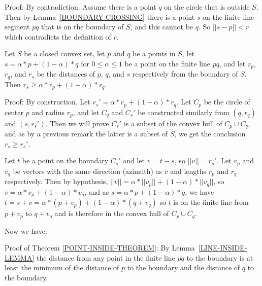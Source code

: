 \documentclass[12pt]{article}
\begin{document}
\begin{indpar}{0.2in}
Proof:  By contradiction.  Assume there is a point $q$ on the circle
that is outside $S$.  Then by Lemma~\ref{BOUNDARY-CROSSING} there is
a point $s$ on the finite line segment $pq$ that is on the boundary of
$S$, and this cannot be $q$.  So $||s-p||<r$ which contradicts the
definition of $r$.
\end{indpar}

\begin{lemma}\label{LINE-INSIDE-LEMMA}
Let $S$ be a closed convex set, let $p$ and $q$ be a points in $S$,
let $s=\alpha*p+(1-\alpha)*q$ for $0\le\alpha\le 1$ be a point on the
finite line $pq$, and let $r_p$, $r_q$, and $r_s$ be the distances
of $p$, $q$, and $s$ respectively from the boundary of $S$.
Then $r_s\ge\alpha*r_p+(1-\alpha)*r_q$.
\end{lemma}

\begin{indpar}{0.2in}
Proof:  By construction.  Let $r_s'=\alpha*r_p+(1-\alpha)*r_q$.
Let $C_p$ be the circle of center $p$ and
radius $r_p$, and let $C_q$ and $C_s'$ be constructed similarly from
$(q,r_q)$ and $(s,r_s')$.  Then we will prove $C_s'$ is a subset of
the convex hull of $C_p\cup C_q$, and as by a previous remark
the latter is a subset of $S$, we get the conclusion $r_s\ge r_s'$.

Let $t$ be a point on the boundary $C_s'$ and let $v=t-s$, so
$||v||=r_s'$.  Let $v_p$ and $v_q$ be vectors
with the same direction (azimuth) as $v$ and lengths $r_p$ and $r_q$
respectively.  Then by hypothesis,
$||v|| = \alpha*||v_p||+(1-\alpha)*||v_q||$, so
$v = \alpha*v_p+(1-\alpha)*v_q$, and as
$s = \alpha*p+(1-\alpha)*q$, we have
$t=s+v=\alpha*(p+v_p)+(1-\alpha)*(q+v_q)$ so
$t$ is on the finite line from $p+v_p$ to $q+v_q$ and is therefore in the
convex hull of $C_p\cup C_q$.
\end{indpar}

Now we have:

\begin{indpar}{0.2in}
Proof of Theorem \ref{POINT-INSIDE-THEOREM}:
By Lemma~\ref{LINE-INSIDE-LEMMA} the distance from any point in
the finite line $pq$ to the boundary is at least the minimum
of the distance of $p$ to the boundary and the distance of $q$
to the boundary.
\end{indpar}



\newpage
\end{document}
